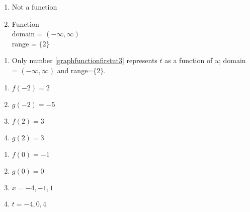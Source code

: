 \begin{multicols}{2}
\begin{enumerate}
\setcounter{enumi}{\value{HW}}

\item   Not a function

\vfill

\columnbreak

\item  Function \\ domain = $(-\infty, \infty)$ \\ range = $\{2\}$

\setcounter{HW}{\value{enumi}}
\end{enumerate}
\end{multicols}

\begin{enumerate}
\setcounter{enumi}{\value{HW}}

\item  Only number \ref{graphfunctionfirstut3} represents $t$ as a function of $u$;  domain = $(-\infty, \infty)$ and range=$\{2 \}$.

\setcounter{HW}{\value{enumi}}
\end{enumerate}


\begin{multicols}{4}

\begin{enumerate}

\setcounter{enumi}{\value{HW}}

\item  $f(-2) = 2$

\item $g(-2) = -5$

\item $f(2) = 3$

\item  $g(2) = 3$


\setcounter{HW}{\value{enumi}}

\end{enumerate}

\end{multicols}

\begin{multicols}{4}

\begin{enumerate}

\setcounter{enumi}{\value{HW}}

\item $f(0) = -1$

\item $g(0) = 0$

\item  $x  = -4, -1, 1$

\item  $t = -4, 0, 4$

\setcounter{HW}{\value{enumi}}

\end{enumerate}

\end{multicols}

